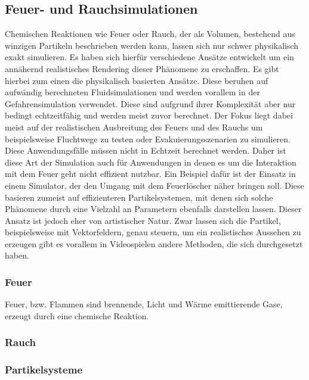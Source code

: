 \subsection{Feuer- und Rauchsimulationen}
Chemischen Reaktionen wie Feuer oder Rauch, der als Volumen, bestehend aus winzigen Partikeln beschrieben werden kann, 
lassen sich nur schwer physikalisch exakt simulieren. Es haben sich hierfür verschiedene Ansätze entwickelt um ein
annähernd realistisches Rendering dieser Phänomene zu erschaffen. Es gibt hierbei zum einen die physikalisch basierten Ansätze. 
Diese beruhen auf aufwändig berechneten Fluidsimulationen und werden vorallem in der Gefahrensimulation verwendet.
Diese sind aufgrund ihrer Komplexität aber nur bedingt echtzeitfähig und werden meist zuvor berechnet. 
Der Fokus liegt dabei meist auf der realistischen Ausbreitung des Feuers und des Rauchs um beispielsweise Fluchtwege 
zu testen oder Evakuierungsszenarien zu simulieren. Diese Anwendungsfälle müssen nicht in Echtzeit berechnet werden.
Daher ist diese Art der Simulation auch für Anwendungen in denen es um die Interaktion mit dem Feuer geht nicht 
effizient nutzbar. Ein Beispiel dafür ist der Einsatz in einem Simulator, der den Umgang mit dem Feuerlöscher
näher bringen soll. Diese basieren zumeist auf effizienteren Partikelsystemen, mit denen sich solche Phänomene 
durch eine Vielzahl an Parametern ebenfalls darstellen lassen. Dieser Ansatz ist jedoch eher von artistischer Natur. 
Zwar lassen sich die Partikel, beispielsweise mit Vektorfeldern, genau steuern, um ein realistisches Aussehen zu 
erzeugen gibt es vorallem in Videospielen andere Methoden, die sich durchgesetzt haben. 


\subsubsection{Feuer}
Feuer, bzw. Flammen sind brennende, Licht und Wärme emittierende Gase, erzeugt durch eine chemische Reaktion. 



\subsubsection{Rauch}

\subsubsection{Partikelsysteme}
